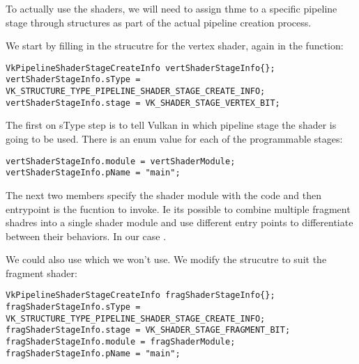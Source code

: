 \par To actually use the shaders, we will need to assign thme to a specific pipeline stage through  structures as part of the actual pipeline creation process. 

\par We start by filling in the strucutre for the vertex shader, again in the  function:

\begin{center}
\begin{minipage}{0.95\linewidth}
\begin{lstlisting}
VkPipelineShaderStageCreateInfo vertShaderStageInfo{};
vertShaderStageInfo.sType = VK_STRUCTURE_TYPE_PIPELINE_SHADER_STAGE_CREATE_INFO;
vertShaderStageInfo.stage = VK_SHADER_STAGE_VERTEX_BIT;
\end{lstlisting}
\end{minipage}
\end{center}

\par The first on sType step is to tell Vulkan in which pipeline stage the shader is going to be used. There is an enum value for each of the programmable stages:

\begin{center}
\begin{minipage}{0.95\linewidth}
\begin{lstlisting}
vertShaderStageInfo.module = vertShaderModule;
vertShaderStageInfo.pName = "main";
\end{lstlisting}
\end{minipage}
\end{center}

\par The next two members specify the shader module with the code and then entrypoint is the fucntion to invoke. Ie its possible to combine multiple fragment shadres into a single shader module and use different entry points to differentiate between their behaviors. In our case .

\par We could also use  which we won't use. We modify the strucutre to suit the fragment shader:

\begin{center}
\begin{minipage}{0.95\linewidth}
\begin{lstlisting}
VkPipelineShaderStageCreateInfo fragShaderStageInfo{};
fragShaderStageInfo.sType = VK_STRUCTURE_TYPE_PIPELINE_SHADER_STAGE_CREATE_INFO;
fragShaderStageInfo.stage = VK_SHADER_STAGE_FRAGMENT_BIT;
fragShaderStageInfo.module = fragShaderModule;
fragShaderStageInfo.pName = "main";
\end{lstlisting}
\end{minipage}
\end{center}

